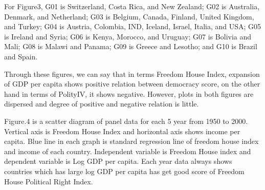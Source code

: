 For Figure3, G01 is Switzerland, Costa Rica, and New Zealand; G02 is Australia, Denmark, and Netherland; G03 is Belgium, Canada, Finland, United Kingdom, and Turkey; G04 is Austria, Colombia, IND, Iceland, Israel, Italia, and USA; G05 is Ireland and Syria; G06 is Kenya, Morocco, and Uruguay; G07 is Bolivia and Mali; G08 is Malawi and Panama; G09 is Greece and Lesotho; and G10 is Brazil and Spain. 


Through these figures, we can say that in terms Freedom House Index, expansion of GDP per capita shows positive relation between democracy score, on the other hand in terms of PolityI\hspace{-.1em}V, it shows negative. However, plots in both figures are dispersed and degree of positive and negative relation is little.


Figure.4 is a scatter diagram of panel data for each 5 year from 1950 to 2000. Vertical axis is Freedom House Index and horizontal axis shows income per capita. Blue line in each graph is standard regression line of freedom house index and income of each country. Independent variable is Freedom House index and dependent variable is Log GDP per capita. Each year data always shows countries which has large log GDP per capita has get good score of Freedom House Political Right Index. 

